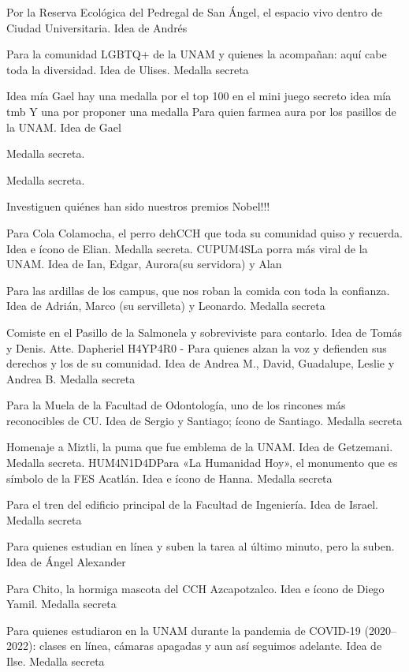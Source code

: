 \begin{description}[leftmargin=1.4cm, style=nextline]
  \item[R3S3RV4] Por la Reserva Ecológica del Pedregal de San Ángel, el espacio vivo dentro de Ciudad Universitaria. Idea de Andrés
  \item[LGBTQ1] Para la comunidad LGBTQ+ de la UNAM y quienes la acompañan: aquí cabe toda la diversidad. Idea de Ulises. Medalla secreta
  \item[4UR4FARM] Idea mía Gael hay una medalla por el top 100 en el mini juego secreto idea mía tmb Y una por proponer una medalla Para quien farmea aura por los pasillos de la UNAM. Idea de Gael
  \item[N0B3LQ] Medalla secreta.
  \item[N0B3LP] Medalla secreta.
  \item[N0B3LL] Investiguen quiénes han sido nuestros premios Nobel!!!
  \item[C0L4M0CH] Para Cola Colamocha, el perro dehCCH que toda su comunidad quiso y recuerda. Idea e ícono de Elian. Medalla secreta. CUPUM4SLa porra más viral de la UNAM. Idea de Ian, Edgar, Aurora(su servidora) y Alan
  \item[4RD1LL4] Para las ardillas de los campus, que nos roban la comida con toda la confianza. Idea de Adrián, Marco (su servilleta) y Leonardo. Medalla secreta
  \item[S4LM0N3L] Comiste en el Pasillo de la Salmonela y sobreviviste para contarlo. Idea de Tomás y Denis. Atte. Dapheriel H4YP4R0 - Para quienes alzan la voz y defienden sus derechos y los de su comunidad. Idea de Andrea M., David, Guadalupe, Leslie y Andrea B. Medalla secreta
  \item[HU3LG4] Para la Muela de la Facultad de Odontología, uno de los rincones más reconocibles de CU. Idea de Sergio y Santiago; ícono de Santiago. Medalla secreta
  \item[M1ZTL1] Homenaje a Miztli, la puma que fue emblema de la UNAM. Idea de Getzemani. Medalla secreta. HUM4N1D4DPara «La Humanidad Hoy», el monumento que es símbolo de la FES Acatlán. Idea e ícono de Hanna. Medalla secreta
  \item[TR3N1NG] Para el tren del edificio principal de la Facultad de Ingeniería. Idea de Israel. Medalla secreta
  \item[0NLIN31159] Para quienes estudian en línea y suben la tarea al último minuto, pero la suben. Idea de Ángel Alexander
  \item[CH1T0] Para Chito, la hormiga mascota del CCH Azcapotzalco. Idea e ícono de Diego Yamil. Medalla secreta
  \item[C0VID19] Para quienes estudiaron en la UNAM durante la pandemia de COVID-19 (2020–2022): clases en línea, cámaras apagadas y aun así seguimos adelante. Idea de Ilse. Medalla secreta

\end{description}

